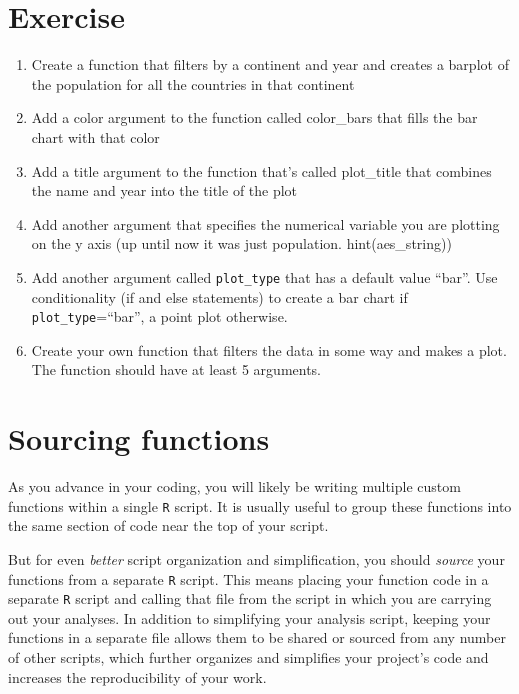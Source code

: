 \documentclass[
]{book}
\begin{document}
\hypertarget{exercise}{%
\section*{Exercise}\label{exercise}}

\begin{enumerate}
\def\labelenumi{\arabic{enumi})}
\item
  Create a function that filters by a continent and year and creates a barplot of the population for all the countries in that continent
\item
  Add a color argument to the function called color\_bars that fills the bar chart with that color
\item
  Add a title argument to the function that's called plot\_title that combines the name and year into the title of the plot
\item
  Add another argument that specifies the numerical variable you are plotting on the y axis (up until now it was just population. hint(aes\_string))
\item
  Add another argument called \texttt{plot\_type} that has a default value ``bar''. Use conditionality (if and else statements) to create a bar chart if \texttt{plot\_type}=``bar'', a point plot otherwise.
\item
  Create your own function that filters the data in some way and makes a plot. The function should have at least 5 arguments.
\end{enumerate}

\hypertarget{sourcing-functions}{%
\section*{Sourcing functions}\label{sourcing-functions}}

As you advance in your coding, you will likely be writing multiple custom functions within a single \texttt{R} script. It is usually useful to group these functions into the same section of code near the top of your script.

But for even \emph{better} script organization and simplification, you should \emph{source} your functions from a separate \texttt{R} script. This means placing your function code in a separate \texttt{R} script and calling that file from the script in which you are carrying out your analyses. In addition to simplifying your analysis script, keeping your functions in a separate file allows them to be shared or sourced from any number of other scripts, which further organizes and simplifies your project's code and increases the reproducibility of your work.
\end{document}
